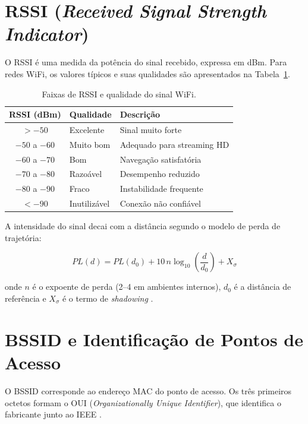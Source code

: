 \documentclass[
  12pt,
  a4paper,
  oneside,
  brazil,
  chapter=TITLE,
  section=TITLE,
]{abntex2}
\begin{document}
\section{RSSI (\textit{Received Signal Strength Indicator})}

O RSSI é uma medida da potência do sinal recebido, expressa em dBm. Para redes
WiFi, os valores típicos e suas qualidades são apresentados na
Tabela~\ref{tab:rssi_qualidade}.

\begin{table}[ht]
  \centering
  \caption{Faixas de RSSI e qualidade do sinal WiFi.}
  \label{tab:rssi_qualidade}
  \begin{tabular}{cll}
    \toprule
    \textbf{RSSI (dBm)} & \textbf{Qualidade} & \textbf{Descrição} \\
    \midrule
    $> -50$         & Excelente    & Sinal muito forte \\
    $-50$ a $-60$   & Muito bom    & Adequado para streaming HD \\
    $-60$ a $-70$   & Bom          & Navegação satisfatória \\
    $-70$ a $-80$   & Razoável     & Desempenho reduzido \\
    $-80$ a $-90$   & Fraco        & Instabilidade frequente \\
    $< -90$         & Inutilizável & Conexão não confiável \\
    \bottomrule
  \end{tabular}
\end{table}

A intensidade do sinal decai com a distância segundo o modelo de perda de
trajetória:

\begin{equation}
  PL(d) = PL(d_0) + 10\,n\log_{10}\!\left(\frac{d}{d_0}\right) + X_\sigma
  \label{eq:pathloss}
\end{equation}

\noindent onde $n$ é o expoente de perda (2--4 em ambientes internos),
$d_0$ é a distância de referência e $X_\sigma$ é o termo de
\textit{shadowing} \cite{rappaport2002}.

\section{BSSID e Identificação de Pontos de Acesso}

O BSSID corresponde ao endereço MAC do ponto de acesso. Os três primeiros
octetos formam o OUI (\textit{Organizationally Unique Identifier}), que
identifica o fabricante junto ao IEEE \cite{ieee80211-2020}.
\end{document}
